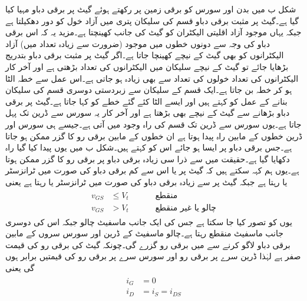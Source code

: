 شکل  ب میں بدن اور سورس کو برقی زمین پر رکھتے ہوئے گیٹ پر برقی دباو  مہیا کیا گیا ہے۔گیٹ پر مثبت برقی دباو   قسم کی سلیکان پتری میں آزاد خول کو دور دھکیلتا ہے جبکہ یہاں موجود آزاد اقلیتی الیکٹران کو گیٹ کی جانب کھینچتا ہے۔مزید یہ کہ اس برقی دباو کی وجہ سے دونوں  خطوں میں موجود (ضرورت سے زیادہ تعداد میں) آزاد الیکٹرانوں کو بھی گیٹ کے نیچے کھینچا جاتا ہے۔اگر گیٹ پر مثبت برقی دباو بتدریج بڑھایا جائے تو گیٹ کے نیچے  سلیکان میں الیکٹرانوں کی تعداد بڑھتی ہے اور آخر کار  الیکٹرانوں کی تعداد خولوں کی تعداد سے بھی زیادہ ہو جاتی ہے۔اس عمل سے  خطہ الٹا ہو کر  خطہ بن جاتا ہے۔ایک قسم کے سلیکان سے زبردستی دوسری قسم کی سلیکان بنانے کے عمل کو  کہتے ہیں اور ایسے الٹا کئے گئے خطے کو   کہا جاتا ہے۔گیٹ پر برقی دباو بڑھانے سے گیٹ کے نیچے  بھی بڑھتا ہے اور آخر کار یہ سورس سے ڈرین تک پہل جاتا ہے۔یوں سورس سے ڈرین تک  قسم کی راہ وجود میں آتی ہے۔جیسے ہی سورس اور ڈرین خطوں کے مابین راہ پیدا ہوتا ہے ان خطوں کے مابین برقی رو کا گزر ممکن ہو جاتا ہے۔جس برقی دباو پر ایسا ہو جائے اس کو    کہتے ہیں۔شکل  ب میں یوں پیدا کیا گیا راہ دکھایا گیا ہے۔حقیقت میں  سے ذرا سی زیادہ برقی دباو پر برقی رو کا گزر ممکن ہوتا ہے۔یوں ہم کہہ سکتے ہیں کہ گیٹ پر  یا اس سے کم برقی دباو کی صورت میں ٹرانزسٹر  یا  رہتا ہے جبکہ گیٹ پر  سے زیادہ برقی دباو کی صورت میں ٹرانزسٹر  یا  رہتا ہے یعنی
\begin{gather}
\begin{aligned}
v_{GS} &\le  V_t && & & \text{منقطع} \\
v_{GS} & > V_t && & & \text{چالو یا غیر منقطع}
\end{aligned}
\end{gather}
یوں  کو  تصور کیا جا سکتا ہے جس کی ایک جانب ماسفیٹ چالو جبکہ اس کی دوسری جانب ماسفیٹ منقطع رہتا ہے۔چالو ماسفیٹ کے ڈرین اور سورس سروں کے مابین برقی دباو  لاگو کرنے سے   میں برقی رو  گزرے گی۔چونکہ گیٹ کی برقی رو کی قیمت صفر ہے لہٰذا ڈرین سرے پر برقی رو  اور سورس سرے پر برقی رو  کی قیمتیں برابر ہوں گی یعنی 
\begin{gather}
\begin{aligned}
i_G &=0 \\
i_D &=i_S= i_{DS}
\end{aligned}
\end{gather}
